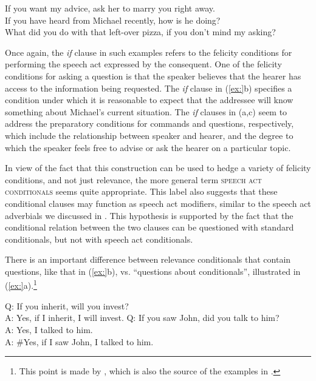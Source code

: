\ea
\ea If you want my advice, ask her to marry you right away.\\
\ex If you have heard from Michael recently, how is he doing?\\
\ex What did you do with that left-over pizza, if you don’t mind my asking?
                       \z
\z


Once again, the \textit{if} clause in such examples refers to the felicity conditions for performing the speech act expressed by the consequent. One of the felicity conditions for asking a question is that the speaker believes that the hearer has access to the information being requested. The \textit{if} clause in (\ref{ex:}b) specifies a condition under which it is reasonable to expect that the addressee will know something about Michael’s current situation. The \textit{if} clauses in (a,c) seem to address the preparatory conditions for commands and questions, respectively, which include the relationship between speaker and hearer, and the degree to which the speaker feels free to advise or ask the hearer on a particular topic.



In view of the fact that this construction can be used to hedge a variety of felicity conditions, and not just relevance, the more general term \textsc{speech act conditionals} seems quite appropriate. This label also suggests that these conditional clauses may function as speech act modifiers, similar to the speech act adverbials we discussed in . This hypothesis is supported by the fact that the conditional relation between the two clauses can be questioned with standard conditionals, but not with speech act conditionals.



There is an important difference between relevance conditionals that contain questions, like that in (\ref{ex:}b), vs. “questions about conditionals”, illustrated in (\ref{ex:}a).\footnote{This point is made by \citet{vanderAuwera1986}, which is also the source of the examples in .}


\ea
\ea  Q: If you inherit, will you invest?\\
A: Yes, if I inherit, I will invest.
\ex  Q: If you saw John, did you talk to him?\\
A: Yes, I talked to him.\\
A: \#Yes, if I saw John, I talked to him.
\z \z


